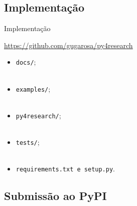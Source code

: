 \subsection{Implementação}
\label{ss.implementation}

\begin{frame}{Implementação}
	\begin{alertblock}{}
		\centering
		\url{https://github.com/gugarosa/py4research}
	\end{alertblock}
\end{frame}

\begin{frame}{}
	\justify
	\begin{itemize}
		\item<1> \texttt{docs/};
		\\~\\
		\item<2> \texttt{examples/};
		\\~\\
		\item<3> \texttt{py4research/};
		\\~\\
		\item<4> \texttt{tests/};
		\\~\\
		\item<5> \texttt{requirements.txt e setup.py}.
	\end{itemize}
\end{frame}

\subsection{Submissão ao PyPI}
\label{ss.pypi_submission}

